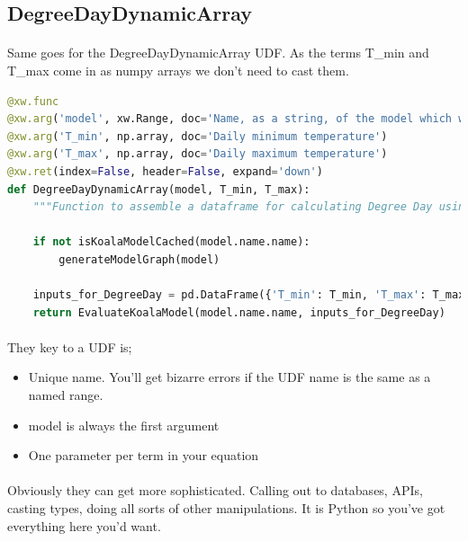 \documentclass[12pt,a4paper,twoside,openright,titlepage]{article}
\begin{document}
\subsection{DegreeDayDynamicArray}

\paragraph{} Same goes for the DegreeDayDynamicArray UDF. As the terms T\_min and T\_max come in as numpy arrays we don't need to cast them.

\begin{lstlisting}[language=Python]
@xw.func
@xw.arg('model', xw.Range, doc='Name, as a string, of the model which will be evaluated. The Excel cell name / named range.')
@xw.arg('T_min', np.array, doc='Daily minimum temperature')
@xw.arg('T_max', np.array, doc='Daily maximum temperature')
@xw.ret(index=False, header=False, expand='down')
def DegreeDayDynamicArray(model, T_min, T_max):
    """Function to assemble a dataframe for calculating Degree Day using dynamic arrays"""

    if not isKoalaModelCached(model.name.name):
        generateModelGraph(model)

    inputs_for_DegreeDay = pd.DataFrame({'T_min': T_min, 'T_max': T_max})
    return EvaluateKoalaModel(model.name.name, inputs_for_DegreeDay)
\end{lstlisting}

\paragraph{} They key to a UDF is;
\begin{itemize}
	\item Unique name. You'll get bizarre errors if the UDF name is the same as a named range.
	\item model is always the first argument
	\item One parameter per term in your equation
\end{itemize}

\paragraph{} Obviously they can get more sophisticated. Calling out to databases, APIs, casting types, doing all sorts of other manipulations. It is Python so you've got everything here you'd want.

\newpage 
\printindex
\end{document}
